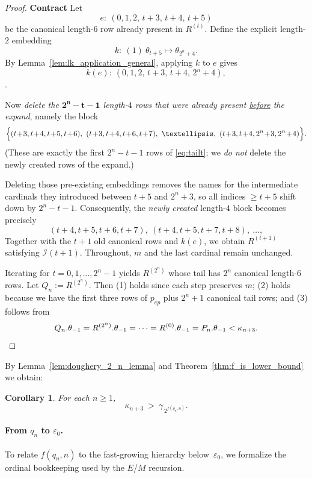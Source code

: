 \documentclass{article}
\newtheorem{corollary}[lemma]{Corollary}
\theoremstyle{definition}
\theoremstyle{remark}
\begin{document}
\begin{proof}
\smallskip
\textbf{Contract}
Let
\[
e:\ (0,1,2,\,t\!+\!3,\,t\!+\!4,\,t\!+\!5)
\]
be the canonical length-$6$ row already present in $R^{(t)}$.
Define the explicit length-$2$ embedding
\[
k:\ (1)\ \theta_{t+5}\longmapsto \theta_{2^n+4}.
\]
By Lemma~\ref{lem:lk_application_general}, applying $k$ to $e$ gives
\[
k(e):\ (0,1,2,\,t\!+\!3,\,t\!+\!4,\,2^n\!+\!4),
\]
.

Now \emph{delete the \(\mathbf{2^n-t-1}\) length-$4$ rows that were already present \underline{before} the expand}, namely the block
\[
\Bigl\{(t\!+\!3,t\!+\!4,t\!+\!5,t\!+\!6),\ (t\!+\!3,t\!+\!4,t\!+\!6,t\!+\!7),\ \ldots,\ (t\!+\!3,t\!+\!4,2^n\!+\!3,2^n\!+\!4)\Bigr\}.
\]
(These are exactly the first $2^n{-}t{-}1$ rows of \eqref{eq:tailt}; we \emph{do not} delete the newly created rows of the expand.)

Deleting those pre-existing embeddings removes the names for the intermediate cardinals they introduced between $t\!+\!5$ and $2^n\!+\!3$, so all indices $\ge \!t\!+\!5$ shift down by $2^n-t-1$. Consequently, the \emph{newly created} length-$4$ block becomes precisely
\[
(t\!+\!4,t\!+\!5,t\!+\!6,t\!+\!7),\ (t\!+\!4,t\!+\!5,t\!+\!7,t\!+\!8),\ \ldots,
\]
Together with the $t+1$ old canonical rows and $k(e)$, we obtain $R^{(t+1)}$ satisfying $\mathcal I(t+1)$. Throughout, $m$ and the last cardinal remain unchanged.

\smallskip
Iterating for $t=0,1,\ldots,2^n-1$ yields $R^{(2^n)}$ whose tail has $2^n$ canonical length-$6$ rows. Let $Q_n:=R^{(2^n)}$. Then (1) holds since each step preserves $m$; (2) holds because we have the first three rows of $p_{ep}$ plus $2^n+1$ canonical tail rows; and (3) follows from
\[
Q_n.\theta_{-1}=R^{(2^n)}.\theta_{-1}=\cdots=R^{(0)}.\theta_{-1}=P_n.\theta_{-1}<\kappa_{n+3}.
\qedhere \]
\end{proof}




By Lemma~\ref{lem:doughery_2_n_lemma} and Theorem~\ref{thm:f_is_lower_bound} we obtain:

\begin{corollary}\label{cor:Qn-lower}
For each $n\ge 1$,
\[
\kappa_{n+3}\ >\ \gamma_{\,2^{f(q_n,n)}}.
\]
\end{corollary}

\paragraph{From $q_n$ to $\varepsilon_0$.}
To relate $f(q_n,n)$ to the fast-growing hierarchy below~$\varepsilon_0$, we formalize the ordinal bookkeeping used by the $E$/$M$ recursion.
\end{document}
